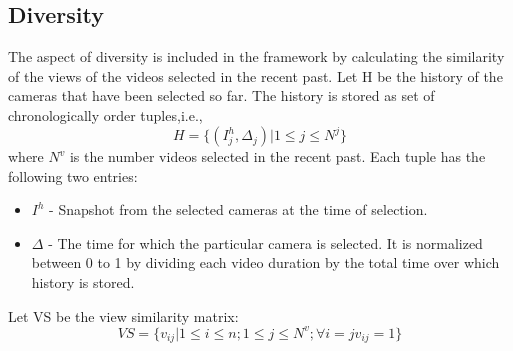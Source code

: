 \documentclass{sig-alternate}
\begin{document}
\subsection{Diversity}
The aspect of diversity is included in the framework by calculating the similarity of the views of the videos selected in the recent past. Let H be the history of the cameras that have been selected so far. The history is stored as set of chronologically order tuples,i.e.,
\[
 H = \big\{(I_j^h,\Delta_j)|1\leq j \leq N^j\big\}
\]
where $N^v$ is the number videos selected in the recent past. Each tuple has the following two entries:
\begin{itemize}
    \item $I^h$ - Snapshot from the selected cameras at the time of selection.
    \item $\Delta$ - The time for which the particular camera is selected. It is normalized between 0 to 1 by dividing each video duration by the total time over which history is stored. 
\end{itemize}
Let VS be the view similarity matrix:
\[
 VS = \big\{ v_{ij}| 1 \leq i \leq n;1 \leq j \leq N^v;\forall i =j v_{ij}=1\big\}
\]
\end{document}
